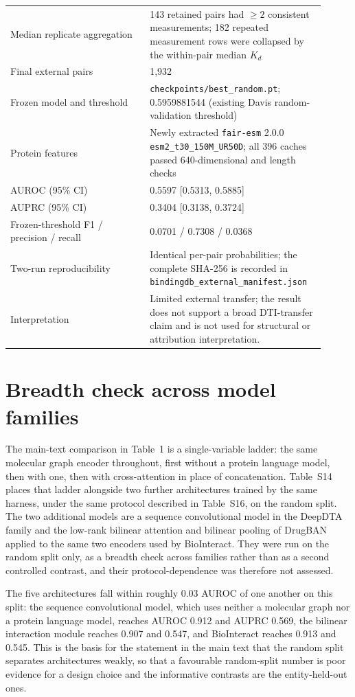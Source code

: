 \documentclass[11pt]{article}
\begin{document}
\begin{table}[H]
\begin{tabular}{p{0.42\linewidth}p{0.49\linewidth}}
Median replicate aggregation & 143 retained pairs had $\geq2$ consistent measurements; 182 repeated measurement rows were collapsed by the within-pair median $K_d$ \\
Final external pairs & 1,932 \\
Frozen model and threshold & \texttt{checkpoints/best\_random.pt}; 0.5959881544 (existing Davis random-validation threshold) \\
Protein features & Newly extracted \texttt{fair-esm} 2.0.0 \texttt{esm2\_t30\_150M\_UR50D}; all 396 caches passed 640-dimensional and length checks \\
AUROC (95\% CI) & 0.5597 [0.5313, 0.5885] \\
AUPRC (95\% CI) & 0.3404 [0.3138, 0.3724] \\
Frozen-threshold F1 / precision / recall & 0.0701 / 0.7308 / 0.0368 \\
Two-run reproducibility & Identical per-pair probabilities; the complete SHA-256 is recorded in \texttt{bindingdb\_external\_manifest.json} \\
Interpretation & Limited external transfer; the result does not support a broad DTI-transfer claim and is not used for structural or attribution interpretation. \\
\bottomrule
\end{tabular}
\end{table}

\clearpage
\section*{Breadth check across model families}

The main-text comparison in Table~1 is a single-variable ladder: the same
molecular graph encoder throughout, first without a protein language model,
then with one, then with cross-attention in place of concatenation. Table~S14
places that ladder alongside two further architectures trained by the same
harness, under the same protocol described in Table~S16, on the random split.
The two additional models are a sequence convolutional model in the DeepDTA
family and the low-rank bilinear attention and bilinear pooling of DrugBAN
applied to the same two encoders used by BioInteract. They were run on the
random split only, as a breadth check across families rather than as a second
controlled contrast, and their protocol-dependence was therefore not assessed.

The five architectures fall within roughly 0.03 AUROC of one another on this
split: the sequence convolutional model, which uses neither a molecular graph
nor a protein language model, reaches AUROC 0.912 and AUPRC 0.569, the bilinear
interaction module reaches 0.907 and 0.547, and BioInteract reaches 0.913 and
0.545. This is the basis for the statement in the main text that the random
split separates architectures weakly, so that a favourable random-split number
is poor evidence for a design choice and the informative contrasts are the
entity-held-out ones.
\end{document}
